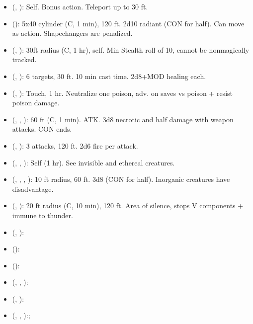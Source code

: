 \begin{itemize}
	\item {} (, ): Self. Bonus action. Teleport up to 30 ft.
	\item {} (): 5x40 cylinder (C, 1 min), 120 ft. 2d10 radiant (CON for half). Can move as action. Shapechangers are penalized.
	\item {} (, ): 30ft radius (C, 1 hr), self. Min Stealth roll of 10, cannot be nonmagically tracked.
	\item {} (, ): 6 targets, 30 ft. 10 min cast time. 2d8+MOD healing each.
	\item {} (, ): Touch, 1 hr. Neutralize one poison, adv. on saves vs poison + resist poison damage.
	\item {} (, , ): 60 ft (C, 1 min). ATK. 3d8 necrotic and half damage with weapon attacks. CON ends.
	\item {} (, ): 3 attacks, 120 ft. 2d6 fire per attack.
	\item {} (, , ): Self (1 hr). See invisible and ethereal creatures.
	\item {} (, , , ): 10 ft radius, 60 ft. 3d8 (CON for half). Inorganic creatures have disadvantage.
	\item {} (, ): 20 ft radius (C, 10 min), 120 ft. Area of silence, stops V components + immune to thunder.
	\item {} (, ):
	\item {} ():
	\item {} ():
	\item {} (, , ):
	\item {} (, ):
	\item {} (, , ):;
\end{itemize}

